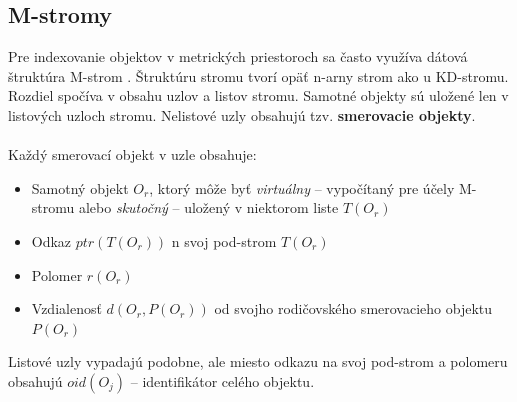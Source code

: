 \documentclass[12pt,a4paper,oneside]{fithesis2}
\begin{document}
\subsection{M-stromy}
   Pre indexovanie objektov v metrických priestoroch sa často využíva dátová štruktúra M-strom \cite{stromy}. Štruktúru stromu tvorí opäť n-arny strom ako u KD-stromu. Rozdiel spočíva v obsahu uzlov a listov stromu. Samotné objekty sú uložené len v listových uzloch stromu. Nelistové uzly obsahujú tzv. \textbf{smerovacie objekty}. \\\\
Každý smerovací objekt v uzle obsahuje:
\begin{itemize}
\item Samotný objekt $O_r$, ktorý môže byť \textit{virtuálny} -- vypočítaný pre účely M-stromu alebo \textit{skutočný} -- uložený v niektorom liste $T(O_r)$
\item Odkaz $ptr(T(O_r))$ n svoj pod-strom $T(O_r)$
\item Polomer $r(O_r)$
\item Vzdialenosť $d(O_r,P(O_r))$  od svojho rodičovského smerovacieho objektu $P(O_r)$
\end{itemize}
Listové uzly vypadajú podobne, ale miesto odkazu na svoj pod-strom a polomeru obsahujú $oid(O_j)$ -- identifikátor celého objektu.\\
\end{document}
